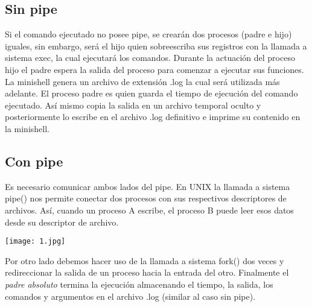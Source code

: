 \documentclass[11pt]{article}
\begin{document}
\subsection{Sin pipe}

Si el comando ejecutado no posee pipe, se crearán dos procesos (padre e hijo) iguales, sin embargo, será el hijo quien sobreescriba sus registros con la llamada a sistema exec, la cual ejecutará los comandos. Durante la actuación del proceso hijo el padre espera la salida del proceso para comenzar a ejecutar sus funciones.\\
La minishell genera un archivo de extensión .log la cual será utilizada más adelante. El proceso padre es quien guarda el tiempo de ejecución del comando ejecutado. Así mismo copia la salida en un archivo temporal oculto y posteriormente lo escribe en el archivo .log definitivo e imprime su contenido en la minishell.  


\subsection{Con pipe}
Es necesario comunicar ambos lados del pipe. En UNIX la llamada a sistema pipe() nos permite conectar dos procesos con sus respectivos descriptores de archivos. Así, cuando un proceso A escribe, el proceso B puede leer esos datos desde su descriptor de archivo.
\begin{center}
\texttt{[image: 1.jpg]}
\end{center}
Por otro lado debemos hacer uso de la llamada a sistema fork() dos veces y redireccionar la salida de un proceso hacia la entrada del otro. Finalmente el \emph{padre absoluto} termina la ejecución almacenando el tiempo, la salida, los comandos y argumentos en el archivo .log (similar al caso sin pipe). 
\end{document}
